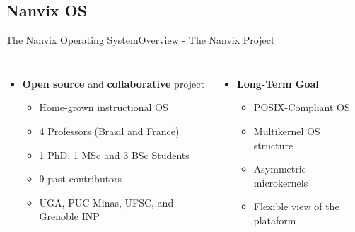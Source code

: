 

	\subsection{Nanvix OS}

		\begin{frame}[fragile]{The Nanvix Operating System}{Overview - The Nanvix Project}

		\begin{columns}[totalwidth=\linewidth]


			\begin{columns}[totalwidth=\linewidth]

					\begin{itemize}
						\item \textbf{Open source} and \textbf{collaborative} project
						\begin{itemize}
							\item Home-grown instructional OS
							\item 4 Professors (Brazil and France)
							\item 1 PhD, 1 MSc and 3 BSc Students
							\item 9 past contributors
							\item UGA, PUC Minas, UFSC, and Grenoble INP
						\end{itemize}
					\end{itemize}

			\end{columns} 



			\begin{columns}[totalwidth=\linewidth]

					\begin{itemize}
						\item \textbf{Long-Term Goal}
						\begin{itemize}
							\item POSIX-Compliant OS
							\item Multikernel OS structure
							\item Asymmetric microkernels
							\item Flexible view of the plataform
						\end{itemize}
					\end{itemize}


\end{columns}
\end{columns}
\end{frame}
